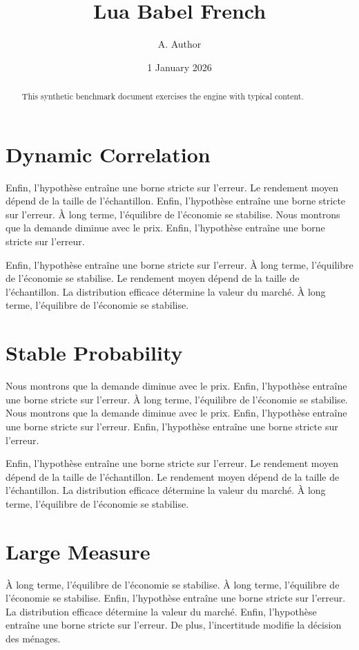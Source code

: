 \documentclass[11pt]{article}
\title{Lua Babel French}
\author{A. Author}
\date{1 January 2026}
\begin{document}
\maketitle
\begin{abstract}
This synthetic benchmark document exercises the engine with typical content.
\end{abstract}
\tableofcontents
\section{Dynamic Correlation}\label{sec:1}

Enfin, l'hypothèse entraîne une borne stricte sur l'erreur. Le rendement moyen dépend de la taille de l'échantillon. Enfin, l'hypothèse entraîne une borne stricte sur l'erreur. À long terme, l'équilibre de l'économie se stabilise. Nous montrons que la demande diminue avec le prix. Enfin, l'hypothèse entraîne une borne stricte sur l'erreur.

Enfin, l'hypothèse entraîne une borne stricte sur l'erreur. À long terme, l'équilibre de l'économie se stabilise. Le rendement moyen dépend de la taille de l'échantillon. La distribution efficace détermine la valeur du marché. À long terme, l'équilibre de l'économie se stabilise.

\section{Stable Probability}\label{sec:2}

Nous montrons que la demande diminue avec le prix. Enfin, l'hypothèse entraîne une borne stricte sur l'erreur. À long terme, l'équilibre de l'économie se stabilise. Nous montrons que la demande diminue avec le prix. Enfin, l'hypothèse entraîne une borne stricte sur l'erreur. Enfin, l'hypothèse entraîne une borne stricte sur l'erreur.

Enfin, l'hypothèse entraîne une borne stricte sur l'erreur. Le rendement moyen dépend de la taille de l'échantillon. Le rendement moyen dépend de la taille de l'échantillon. La distribution efficace détermine la valeur du marché. À long terme, l'équilibre de l'économie se stabilise.

\section{Large Measure}\label{sec:3}

À long terme, l'équilibre de l'économie se stabilise. À long terme, l'équilibre de l'économie se stabilise. Enfin, l'hypothèse entraîne une borne stricte sur l'erreur. La distribution efficace détermine la valeur du marché. Enfin, l'hypothèse entraîne une borne stricte sur l'erreur. De plus, l'incertitude modifie la décision des ménages.
\end{document}
